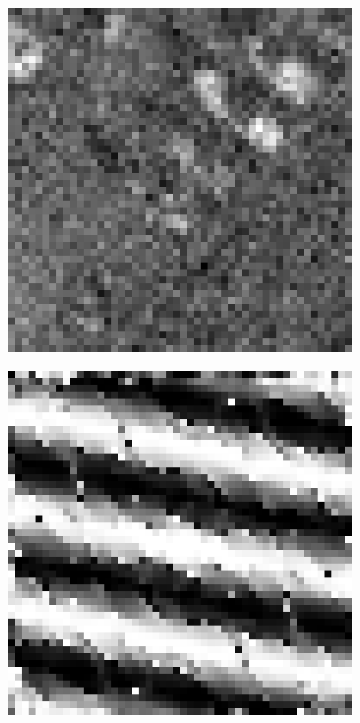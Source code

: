 \begin{figure}[htpb]
\begin{subfigure}{.25\textwidth}
\end{subfigure}%
\begin{subfigure}{.25\textwidth}
\includegraphics[width=1\textwidth]{img/Im1sigma300}
\end{subfigure}
\quad
\begin{subfigure}{.25\textwidth}
\includegraphics[width=1\textwidth]{img/CPSsigma0}

\end{subfigure}
\end{figure}
